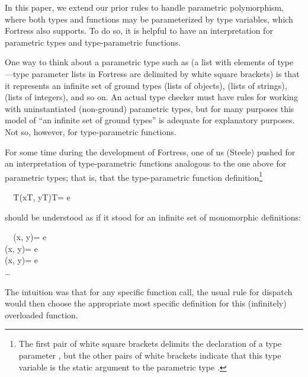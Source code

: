 In this paper, we extend our prior rules 
to handle parametric polymorphism, 
where both types and functions may be parameterized by type variables, 
which Fortress also supports.
To do so, 
it is helpful to have an interpretation for parametric types 
and type-parametric functions.

One way to think about a parametric type such as 
(a list with elements of type ---type parameter lists 
in Fortress are delimited by white square brackets) 
is that it represents an infinite set of ground types 
 (lists of objects),
 (lists of strings), 
 (lists of integers), 
and so on.
An actual type checker must have rules 
for working with uninstantiated (non-ground) parametric types, 
but for many purposes this model of ``an infinite set of ground types'' 
is adequate for explanatory purposes.
Not so, however, for type-parametric functions.  

For some time during the development of Fortress, 
one of us (Steele) pushed for an interpretation of type-parametric functions
analogous to the one above for parametric types;
that is, 
that the type-parametric function definition\footnote{%
The first pair of white square brackets delimits the declaration of a type parameter ,
but the other pairs of white brackets indicate 
that this type variable  is the static argument to the parametric type .}
\small
\begin{FortressCode}
{\tt ~~}\+\llbracket{}T\rrbracket\bigl(x\COLON {}\llbracket{}T\rrbracket, y\COLON {}\llbracket{}T\rrbracket\bigr)\COLON {}\llbracket{}T\rrbracket = e\-
\end{FortressCode}
\normalsize
should be understood as if it stood for an infinite set of monomorphic definitions:
\small
\begin{FortressCode}
{\tt ~~}\+\bigl(x\COLON {}\llbracket{}\rrbracket, y\COLON {}\llbracket{}\rrbracket\bigr)\COLON {}\llbracket{}\rrbracket = e \\
  \bigl(x\COLON {}\llbracket{}\rrbracket, y\COLON {}\llbracket{}\rrbracket\bigr)\COLON {}\llbracket{}\rrbracket = e \\
  \bigl(x\COLON {}\llbracket{}\rrbracket, y\COLON {}\llbracket{}\rrbracket\bigr)\COLON {}\llbracket{}\rrbracket = e \\
  \ldots\-
\end{FortressCode}
\normalsize
The intuition was that for any specific function call,
the usual rule for dispatch would then choose 
the appropriate most specific definition 
for this (infinitely) overloaded function.

